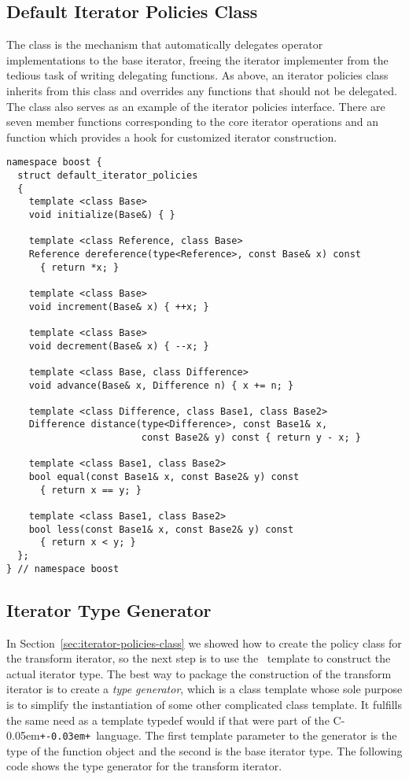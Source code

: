 \documentclass{netobjectdays}
\newcommand{\Cpp}{C\kern-0.05em\texttt{+\kern-0.03em+}}
\newcommand{\iteratoradaptor}{\code{iterator\_\-adaptor}}
\begin{document}
\subsection{Default Iterator Policies Class}

The  class is the mechanism that
automatically delegates operator implementations to the base iterator,
freeing the iterator implementer from the tedious task of writing
delegating functions. As above, an iterator policies class inherits
from this class and overrides any functions that should not be
delegated. The  class also
serves as an example of the iterator policies interface. There are
seven member functions corresponding to the core iterator operations
and an  function which provides a hook for
customized iterator construction.

{\footnotesize
\begin{verbatim}
namespace boost {
  struct default_iterator_policies
  {
    template <class Base>
    void initialize(Base&) { }

    template <class Reference, class Base>
    Reference dereference(type<Reference>, const Base& x) const
      { return *x; }

    template <class Base>
    void increment(Base& x) { ++x; }

    template <class Base>
    void decrement(Base& x) { --x; }

    template <class Base, class Difference>
    void advance(Base& x, Difference n) { x += n; }

    template <class Difference, class Base1, class Base2>
    Difference distance(type<Difference>, const Base1& x,
                        const Base2& y) const { return y - x; }

    template <class Base1, class Base2>
    bool equal(const Base1& x, const Base2& y) const
      { return x == y; }

    template <class Base1, class Base2>
    bool less(const Base1& x, const Base2& y) const
      { return x < y; }
  };
} // namespace boost
\end{verbatim}
}


\subsection{Iterator Type Generator}
\label{sec:iter-type-generator}

In Section~\ref{sec:iterator-policies-class} we showed how to create
the policy class for the transform iterator, so the next step is to
use the \iteratoradaptor\ template to construct the actual iterator
type. The best way to package the construction of the transform
iterator is to create a \emph{type generator}, which is a class
template whose sole purpose is to simplify the instantiation of some
other complicated class template. It fulfills the same need as a
template typedef would if that were part of the \Cpp\ language.  The
first template parameter to the generator is the type of the function
object and the second is the base iterator type.  The following code
shows the type generator for the transform iterator.
\end{document}
